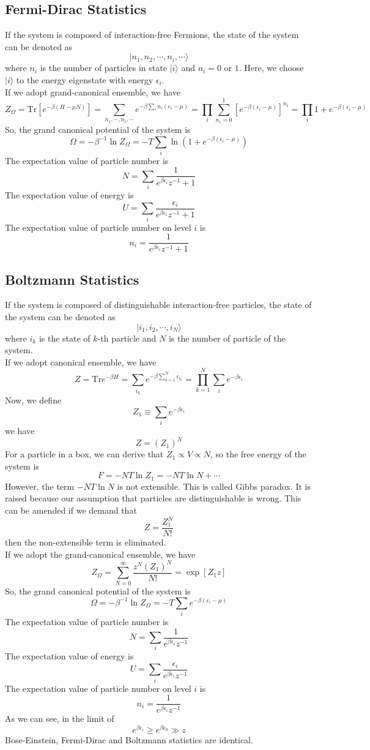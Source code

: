 \documentclass[cyan]{elegantnote}
\begin{document}
\subsection{Fermi-Dirac Statistics}
If the system is composed of interaction-free Fermions, the state of the system can be denoted as
\[|n_1,n_2,\cdots,n_i,\cdots\rangle\] where $n_i$ is the number of particles in state $|i\rangle$ and $n_i = 0$ or $1$. Here, we choose $|i\rangle$ to the energy eigenstate with energy $\epsilon_i$.
\\
If we adopt grand-canonical ensemble, we have
\[Z_{\Omega} = \mathrm{Tr}[e^{-\beta(H-\mu N)}] = \sum_{n_1,\cdots,n_i,\cdots} e^{-\beta \sum_{i}n_i(\epsilon_i-\mu)} = \prod_{i}\sum_{n_i=0}^{1}[e^{-\beta(\epsilon_i-\mu)}]^{n_i} = \prod_{i} 1+e^{-\beta(\epsilon_i - \mu)}\]
So, the grand canonical potential of the system is
\[\Omega = -\beta^{-1}\ln Z_{\Omega} = -T \sum_i \ln (1 + e^{-\beta(\epsilon_i - \mu)})\]
The expectation value of particle number is
\[N = \sum_i \frac{1}{e^{\beta \epsilon_i}z^{-1}+1}\]
The expectation value of energy is
\[U = \sum_i \frac{\epsilon_i}{e^{\beta \epsilon_i}z^{-1}+1}\]
The expectation value of particle number on level $i$ is
\[n_i =  \frac{1}{e^{\beta \epsilon_i}z^{-1}+1}\]

\subsection{Boltzmann Statistics}
If the system is composed of distinguishable interaction-free particles, the state of the system can be denoted as
\[|i_1,i_2,\cdots,i_N\rangle\] where $i_k$ is the state of $k$-th particle and $N$ is the number of particle of the system. 
\\
If we adopt canonical ensemble, we have
\[Z =　\mathrm{Tr} e^{-\beta H} = \sum_{i_k} e^{-\beta\sum_{k=1}^N \epsilon_{i_k}} = \prod_{k=1}^N \sum_i e^{-\beta \epsilon_i}\]
Now, we define
\[Z_1 \equiv \sum_i e^{-\beta \epsilon_i}\] we have
\[Z = (Z_1)^N\]
For a particle in a box, we can derive that $Z_1 \propto V \propto N$, so the free energy of the system is
\[F = -NT\ln Z_1 = -NT\ln N + \cdots\]
However, the term $-NT\ln N$ is not extensible. This is called Gibbs paradox. It is raised because our assumption that particles are distinguishable is wrong. This can be amended if we demand that
\[Z = \frac{Z_1^N}{N!}\]
then the non-extensible term is eliminated.
\\ 
If we adopt the grand-canonical ensemble, we have
\[Z_{\Omega} = \sum_{N=0}^{\infty} \frac{z^N (Z_1)^N}{N!} = \exp[Z_1 z]\]
So, the grand canonical potential of the system is
\[\Omega = -\beta^{-1}\ln Z_{\Omega} = -T \sum_i e^{-\beta(\epsilon_i-\mu)}\]
The expectation value of particle number is
\[N = \sum_i \frac{1}{e^{\beta \epsilon_i}z^{-1}}\]
The expectation value of energy is
\[U = \sum_i \frac{\epsilon_i}{e^{\beta \epsilon_i}z^{-1}}\]
The expectation value of particle number on level $i$ is
\[n_i =  \frac{1}{e^{\beta \epsilon_i}z^{-1}}\]
As we can see, in the limit of
\[e^{\beta\epsilon_i} \geq e^{\beta\epsilon_0}  \gg z\] Bose-Einstein, Fermi-Dirac and Boltzmann statistics are identical.  
\end{document}
